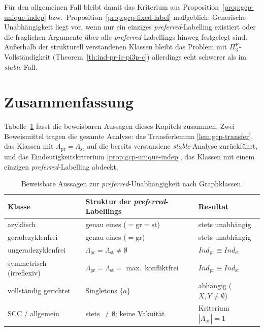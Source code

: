 F\"ur den allgemeinen Fall bleibt damit das Kriterium aus
Proposition~\ref{prop:gcp-unique-indep} bzw.\
Proposition~\ref{prop:gcp-fixed-label} ma\ss geblich: Generische
Unabh\"angigkeit liegt vor, wenn nur ein einziges
\textit{preferred}-Labelling existiert oder die fraglichen Argumente \"uber alle
\textit{preferred}-Labellings hinweg festgelegt sind. Au\ss erhalb der
strukturell verstandenen Klassen bleibt das Problem mit
\(\Pi_3^{\mathrm P}\)-Vollst\"andigkeit (Theorem~\ref{th:ind-pr-is-pi3p-c})
allerdings echt schwerer als im \textit{stable}-Fall.

\section{Zusammenfassung}
\label{sec:gcp-zusammenfassung}

Tabelle~\ref{tab:gcp-overview} fasst die beweisbaren Aussagen dieses Kapitels
zusammen. Zwei Beweismittel tragen die gesamte Analyse: das Transferlemma
\ref{lem:gcp-transfer}, das Klassen mit
\(\Lambda_{\mathrm{pr}}=\Lambda_{\mathrm{st}}\) auf die bereits verstandene
\textit{stable}-Analyse zur\"uckf\"uhrt, und das Eindeutigkeitskriterium
\ref{prop:gcp-unique-indep}, das Klassen mit einem einzigen
\textit{preferred}-Labelling abdeckt.

\begin{table}[htbp]
    \myfloatalign
    \begin{tabularx}{\textwidth}{lXl} \toprule
        Klasse & Struktur der \textit{preferred}-Labellings &
        Resultat \\ \midrule
        azyklisch & genau eines (\(=\mathrm{gr}=\mathrm{st}\)) &
            stets unabh\"angig \\
        geradezyklenfrei & genau eines (\(=\mathrm{gr}\)) &
            stets unabh\"angig \\
        ungeradezyklenfrei & \(\Lambda_{\mathrm{pr}}=\Lambda_{\mathrm{st}}
            \neq\emptyset\) & \(\textit{Ind}_{\mathrm{pr}}\equiv
            \textit{Ind}_{\mathrm{st}}\) \\
        symmetrisch (irreflexiv) & \(\Lambda_{\mathrm{pr}}=\Lambda_{\mathrm{st}}
            =\) max.\ konfliktfrei & \(\textit{Ind}_{\mathrm{pr}}\equiv
            \textit{Ind}_{\mathrm{st}}\) \\
        vollst\"andig gerichtet & Singletons \(\{a\}\) &
            abh\"angig (\(X,Y\neq\emptyset\)) \\
        SCC / allgemein & stets \(\neq\emptyset\); keine Vakuit\"at &
            Kriterium \(|\Lambda_{\mathrm{pr}}|=1\) \\
        \bottomrule
    \end{tabularx}
    \caption[Graphklassen unter \textit{preferred}-Unabh\"angigkeit]{Beweisbare
    Aussagen zur \textit{preferred}-Unabh\"angigkeit nach Graphklassen.}
    \label{tab:gcp-overview}
\end{table}

